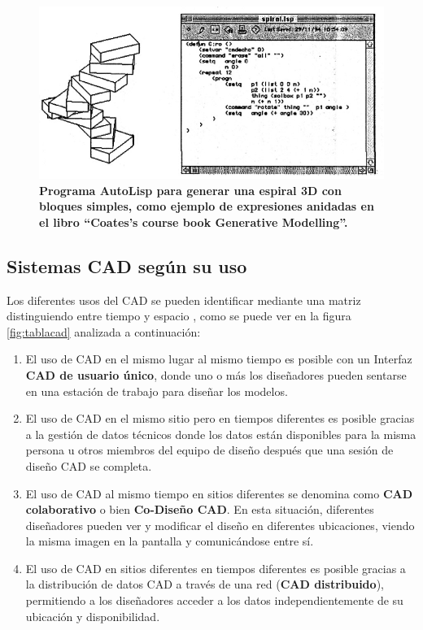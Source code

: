 \begin{figure}[h]
\includegraphics[width=14cm]{Img/CPD/cad-autolisp.jpg}
\centering
\caption{\textbf{\footnotesize{Programa AutoLisp para generar una espiral 3D con bloques simples, como
ejemplo de expresiones anidadas en el libro ``Coates's course book Generative Modelling''. \citep{Celani2008}}}}
\end{figure}



\clearpage

\subsection{Sistemas CAD según su uso}
Los diferentes usos del CAD se pueden identificar mediante una matriz distinguiendo entre tiempo y espacio \citep{Maher1997}, como se puede ver en la figura \ref{fig:tablacad} analizada a continuación:

\begin{enumerate}
\item El uso de CAD en el mismo lugar al mismo tiempo es posible con un Interfaz \textbf{CAD de usuario único}, donde uno o más los diseñadores pueden sentarse en una estación de trabajo para diseñar los modelos.
\item El uso de CAD en el mismo sitio pero en tiempos diferentes es posible gracias a la gestión de datos técnicos donde los datos están disponibles para la misma persona u otros miembros del equipo de diseño después que una sesión de diseño CAD se completa.
\item El uso de CAD al mismo tiempo en sitios diferentes se denomina como
\textbf{CAD colaborativo} o bien \textbf{Co-Diseño CAD}. En esta situación, diferentes diseñadores pueden ver y modificar el diseño en diferentes ubicaciones, viendo la misma imagen en la pantalla y comunicándose entre sí.
\item El uso de CAD en sitios diferentes en tiempos diferentes es posible gracias a la distribución de datos CAD a través de una red (\textbf{CAD distribuido}), permitiendo a los diseñadores acceder a los datos independientemente de su ubicación y disponibilidad.
\end{enumerate}


